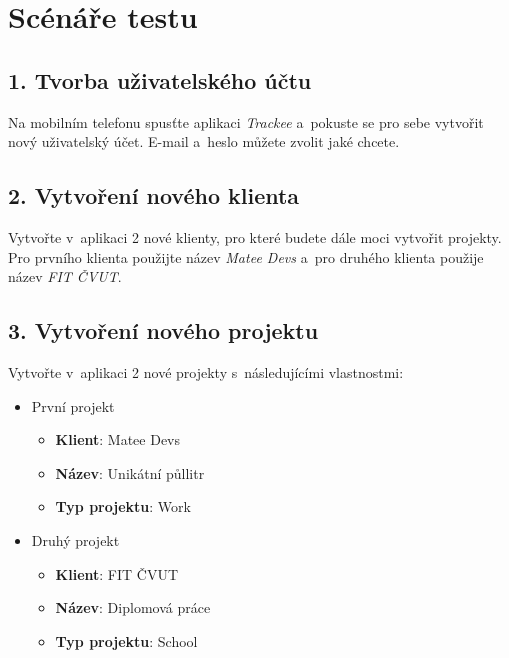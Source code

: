 \section*{Scénáře testu}

\subsection*{1. Tvorba uživatelského účtu}

Na mobilním telefonu spusťte aplikaci \emph{Trackee} a~pokuste se pro sebe vytvořit nový uživatelský účet. E-mail a~heslo můžete zvolit jaké chcete.

\subsection*{2. Vytvoření nového klienta}

Vytvořte v aplikaci 2 nové klienty, pro které budete dále moci vytvořit projekty. Pro prvního klienta použijte název \emph{Matee Devs} a~pro druhého klienta použije název \emph{FIT ČVUT}.

\subsection*{3. Vytvoření nového projektu}

Vytvořte v aplikaci 2 nové projekty s následujícími vlastnostmi:

\begin{itemize}
\item{První projekt}
  \begin{itemize}
  \item{\textbf{Klient}: Matee Devs}
  \item{\textbf{Název}: Unikátní půllitr}
  \item{\textbf{Typ projektu}: Work}
  \end{itemize}
\item{Druhý projekt}
  \begin{itemize}
  \item{\textbf{Klient}: FIT ČVUT}
  \item{\textbf{Název}: Diplomová práce}
  \item{\textbf{Typ projektu}: School} 
  \end{itemize}
\end{itemize}

